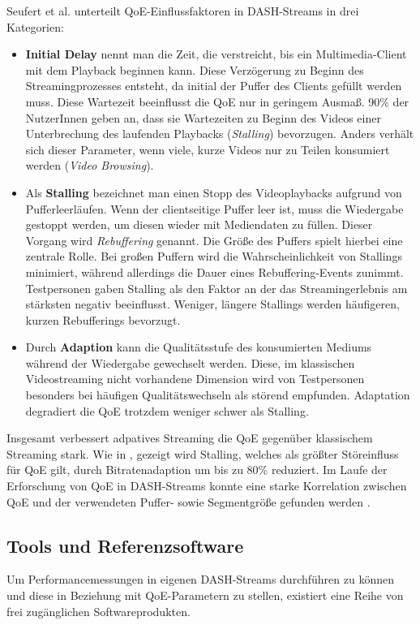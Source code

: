 \documentclass[paper = a4, fontsize = 12pt, parskip = half]{scrartcl} %
\begin{document}
Seufert et al. \cite{seufert_survey_2015} unterteilt QoE-Einflussfaktoren in DASH-Streams in drei Kategorien:
\begin{itemize}
	\item \textbf{Initial Delay} nennt man die Zeit, die verstreicht, bis ein Multimedia-Client mit dem Playback beginnen kann. Diese Verzögerung zu Beginn des Streamingprozesses entsteht, da initial der Puffer des Clients gefüllt werden muss. Diese Wartezeit beeinflusst die QoE nur in geringem Ausmaß. 90\% der NutzerInnen geben an, dass sie Wartezeiten zu Beginn des Videos einer Unterbrechung des laufenden Playbacks (\textit{Stalling}) bevorzugen. Anders verhält sich dieser Parameter, wenn viele, kurze Videos nur zu Teilen konsumiert werden (\textit{Video Browsing}).
	\item Als \textbf{Stalling} bezeichnet man einen Stopp des Videoplaybacks aufgrund von Pufferleerläufen. Wenn der clientseitige Puffer leer ist, muss die Wiedergabe gestoppt werden, um diesen wieder mit Mediendaten zu füllen. Dieser Vorgang wird \textit{Rebuffering} genannt. Die Größe des Puffers spielt hierbei eine zentrale Rolle. Bei großen Puffern wird die Wahrscheinlichkeit von Stallings minimiert, während allerdings die Dauer eines Rebuffering-Events zunimmt. Testpersonen gaben Stalling als den Faktor an der das Streamingerlebnis am stärksten negativ beeinflusst. Weniger, längere Stallings werden häufigeren, kurzen Rebufferings bevorzugt. 
	\item Durch \textbf{Adaption} kann die Qualitätsstufe des konsumierten Mediums während der Wiedergabe gewechselt werden. Diese, im klassischen Videostreaming nicht vorhandene Dimension wird von Testpersonen besonders bei häufigen Qualitätswechseln als störend empfunden. Adaptation degradiert die QoE trotzdem weniger schwer als Stalling.
\end{itemize}

Insgesamt verbessert adpatives Streaming die QoE gegenüber klassischem Streaming stark. Wie in \cite{yao_empirical_2011}, gezeigt wird Stalling, welches als größter Störeinfluss für QoE gilt, durch Bitratenadaption um bis zu 80\% reduziert. Im Laufe der Erforschung von QoE in DASH-Streams konnte eine starke Korrelation zwischen QoE und der verwendeten Puffer- sowie Segmentgröße gefunden werden \cite{seufert_survey_2015}.

\subsection{Tools und Referenzsoftware}
Um Performancemessungen in eigenen DASH-Streams durchführen zu können und diese in Beziehung mit QoE-Parametern zu stellen, existiert eine Reihe von frei zugänglichen Softwareprodukten.
\end{document}
